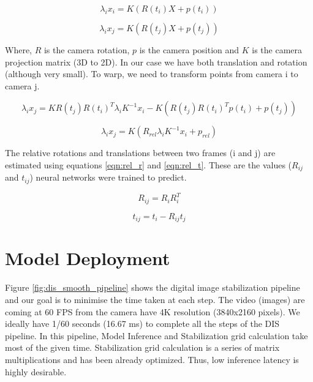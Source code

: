 \begin{equation}
    \lambda_{i} x_{i} = K(R(t_i)X + p(t_i))
\label{eqn:x_ti}
\end{equation}

\begin{equation}
    \lambda_{i} x_{j} = K(R(t_j)X + p(t_j))
\label{eqn:x_tj}
\end{equation}

Where, $ R $ is the camera rotation, $ p $ is the camera position and $ K $ is the camera projection matrix (3D to 2D). In our case we have both translation and rotation (although very small). To warp, we need to transform points from camera i to camera j.

\begin{equation}
    \lambda_{i} x_{j} = KR(t_j)R(t_i)^{T} \lambda_{i} K^{-1} x_{i} - K(R(t_j)R(t_i)^{T} p(t_i) + p(t_j))
\label{eqn:homography}
\end{equation}

\begin{equation}
    \lambda_{i} x_{j} = K(R_{rel} \lambda_{i} K^{-1} x_i + p_{rel})
\label{eqn:homography_simplified}
\end{equation}

The relative rotations and translations between two frames (i and j) are estimated using equations \ref{eqn:rel_r} and \ref{eqn:rel_t}. These are the values ($ R_{ij} $ and $ t_{ij} $) neural networks were trained to predict. 

\begin{equation}
R_{ij} = R_i R_i^T
\label{eqn:rel_r}    
\end{equation}

\begin{equation}
t_{ij} = t_i - R_{ij}t_j
\label{eqn:rel_t}
\end{equation}

\section{Model Deployment}
Figure \ref{fig:dis_smooth_pipeline} shows the digital image stabilization pipeline and our goal is to minimise the time taken at each step. The video (images) are coming at 60 FPS from the camera have 4K resolution (3840x2160 pixels). We ideally have 1/60 seconds (16.67 ms) to complete all the steps of the DIS pipeline. In this pipeline, Model Inference and Stabilization grid calculation take most of the given time. Stabilization grid calculation is a series of matrix multiplications and has been already optimized. Thus, low inference latency is highly desirable.

